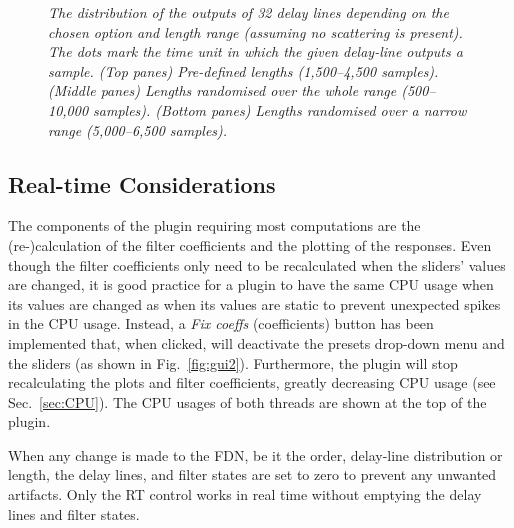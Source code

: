 \documentclass[twoside,a4paper]{article}
\begin{document}
\begin{figure}[t!]
    \caption{\textit{The distribution of the outputs of 32 delay lines depending on the chosen option and length range (assuming no scattering is present). The dots mark the time unit in which the given delay-line outputs a sample. (Top panes) Pre-defined lengths (1,500--4,500 samples). (Middle panes) Lengths randomised over the whole range (500--10,000 samples). (Bottom panes) Lengths randomised over a narrow range (5,000--6,500 samples). }}
    \label{fig:dLens}
\end{figure}

\subsection{Real-time Considerations}\label{sec:realtime}
The components of the plugin requiring most computations are the (re-)calculation of the filter coefficients and the plotting of the responses. Even though the filter coefficients only need to be recalculated when the sliders' values are changed, it is good practice for a plugin to have the same CPU usage when its values are changed as when its values are static to prevent unexpected spikes in the CPU usage. Instead, a \textit{Fix coeffs} (coefficients) button has been implemented that, when clicked, will deactivate the presets drop-down menu and the sliders (as shown in Fig.~\ref{fig:gui2}). Furthermore, the plugin will stop recalculating the plots and filter coefficients, greatly decreasing CPU usage (see Sec.~\ref{sec:CPU}). The CPU usages of both threads are shown at the top of the plugin.

When any change is made to the FDN, be it the order, delay-line distribution or length, the delay lines, and filter states are set to zero to prevent any unwanted artifacts. Only the RT control works in real time without emptying the delay lines and filter states.
\end{document}
